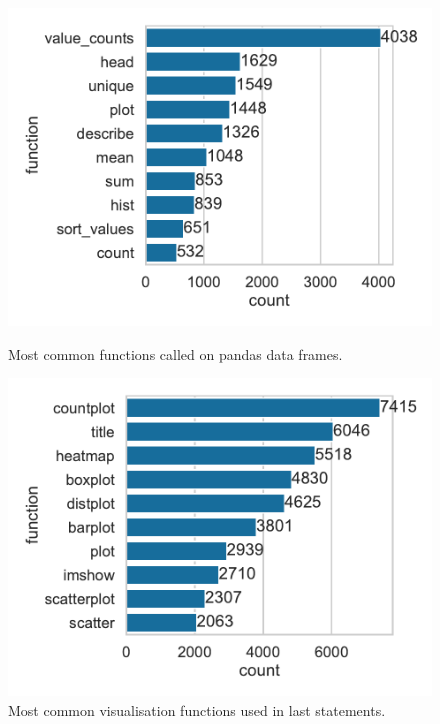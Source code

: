 \begin{figure}
  \centering
  \begin{minipage}{0.49\textwidth}
    \centering
    \includegraphics[width=\linewidth]{common-last-df-functions.pdf}
    \caption{Most common functions called on pandas data frames.}
    \label{fig:common-last-df-functions}
  \end{minipage}
  \hfill
  \begin{minipage}{0.49\textwidth}
    \centering
    \includegraphics[width=\linewidth]{common-last-visualisation-functions.pdf}
    \caption{Most common visualisation functions used in last statements.}
    \label{fig:common-last-visualisation-functions}
  \end{minipage}
\end{figure}

